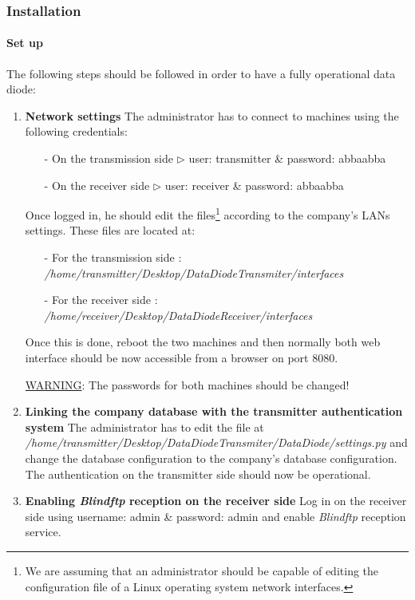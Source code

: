 \documentclass[a4paper,10pt]{article}
\begin{document}
\subsubsection{Installation}
\paragraph{Set up}
The following steps should be followed in order to have a fully operational data diode:


\begin{enumerate}
\item \textbf{Network settings} The administrator has to connect to machines using the following credentials:
	
\begin{enumerate}
\item[-]On the transmission side $\triangleright$ user: transmitter \& password: abbaabba
\item[-]On the receiver side $\triangleright$ user: receiver \& password: abbaabba
\end{enumerate}
 
Once logged in, he should edit the files\footnote{We are assuming that an administrator should be capable of editing the configuration file of a Linux operating system network interfaces.} according to the company's LANs settings. These files are located at:
\begin{enumerate}
\item[-] For the transmission side : \emph{/home/transmitter/Desktop/DataDiodeTransmiter/interfaces}
\item[-] For the receiver side : \emph{/home/receiver/Desktop/DataDiodeReceiver/interfaces}
\end{enumerate}

Once this is done, reboot the two machines and then normally both web interface should be now accessible from a browser on port 8080.

\underline{WARNING}: The passwords for both machines should be changed!

\item \textbf{Linking the company database with the transmitter authentication system} The administrator has to edit the file at \emph{/home/transmitter/Desktop/DataDiodeTransmiter/DataDiode/settings.py} and change the database configuration to the company's database configuration. The authentication on the transmitter side should now be operational.

\item \textbf{Enabling \emph{Blindftp} reception on the receiver side} Log in on the receiver side using username: admin \& password: admin and enable \emph{Blindftp} reception service.


\end{enumerate}
\end{document}
